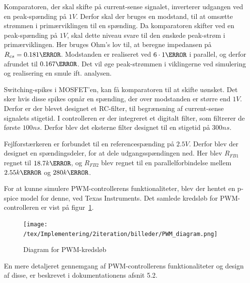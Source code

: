 Komparatoren, der skal skifte på current-sense signalet, inverterer udgangen ved en peak-spænding på $1V$. Derfor skal der bruges en modstand, til at omsætte strømmen i primærviklingen til en spænding. Da komparatoren skifter ved en peak-spænding på $1V$, skal dette niveau svare til den ønskede peak-strøm i primærviklingen. Her bruges Ohm's lov til, at beregne impedansen på $R_{cs} = 0.181\ohm$. Modstanden er realiseret ved $6\cdot 1\ohm$ i parallel, og derfor afrundet til $0.167\ohm$. Det vil øge peak-strømmen i viklingerne ved simulering og realisering en smule ift. analysen. 

Switching-spikes i MOSFET'en, kan få komparatoren til at skifte uønsket. Det sker hvis disse spikes opnår en spænding, der over modstanden er større end $1V$. Derfor er der blevet designet et RC-filter, til begrænsning af current-sense signalets stigetid. I controlleren er der integreret et digitalt filter, som filtrerer de første $100ns$. Derfor blev det eksterne filter designet til en stigetid på $300ns$. 

Fejlforstærkeren er forbundet til en referencespænding på $2.5V$. Derfor blev der designet en spændingsdeler, for at dele udgangsspændingen ned. Her blev $R_{FB1}$ regnet til $18.7k\ohm$, og $R_{FB2}$ blev regnet til en parallelforbindelse mellem $2.55k\ohm$ og $280k\ohm$. 


For at kunne simulere PWM-controllerens funktionaliteter, blev der hentet en p-spice model for denne, ved Texas Instruments\cite{ucc1801-pspice}. Det samlede kredsløb for PWM-controlleren er vist på figur~\ref{fig:PWM_sim_diagram}.

\begin{figure}[H]
	\centering
	\texttt{[image: /tex/Implementering/2iteration/billeder/PWM\_diagram.png]}
	\caption{Diagram for PWM-kredsløb}
	\label{fig:PWM_sim_diagram}
\end{figure} 

\noindent En mere detaljeret gennemgang af PWM-controllerens funktionaliteter og design af disse, er beskrevet i dokumentationens afsnit 5.2.

